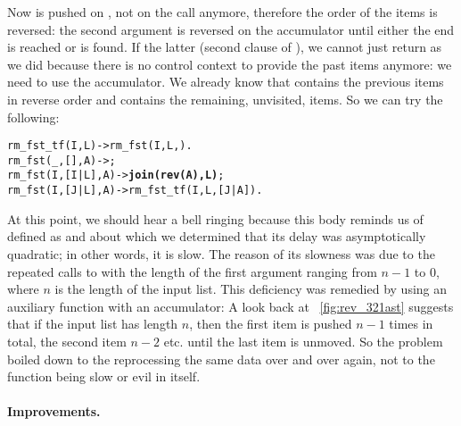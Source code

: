 Now  is pushed on , not on the call anymore,
therefore the order of the items is reversed: the second argument is
reversed on the accumulator until either the end is reached or
 is found. If the latter (second clause of
), we cannot just return  as we did
because there is no control context to provide the past items anymore:
we need to use the accumulator. We already know that 
contains the previous items in reverse order and  contains
the remaining, unvisited, items. So we can try the following:
\begin{alltt}
rm_fst_tf(I,L)    -> rm_fst(I,L,\fbcode{[]}).
rm_fst(_,   [],A) -> \fbox{[]};
rm_fst(I,[I|L],A) -> \textbf{join(rev(A),L)};
rm_fst(I,[J|L],A) -> rm_fst_tf(I,L,[J|A]).
\end{alltt}
At this point, we should hear a bell ringing because this body reminds
us of  defined as  and about
which we determined that its delay was asymptotically quadratic; in
other words, it is slow. The reason of its slowness was due to the
repeated calls to  with the length of the first
argument ranging from \(n-1\) to \(0\), where \(n\) is the length of
the input list. This deficiency was remedied by using an auxiliary
function  with an accumulator:
 A look back at \fig~\vref{fig:rev_321ast}
suggests that if the input list has length \(n\), then the first item
is pushed \(n-1\) times in total, the second item \(n-2\) etc. until
the last item is unmoved. So the problem boiled down to the
reprocessing the same data over and over again, not to the function
 being slow or evil in itself.

\medskip

\paragraph{Improvements.}

